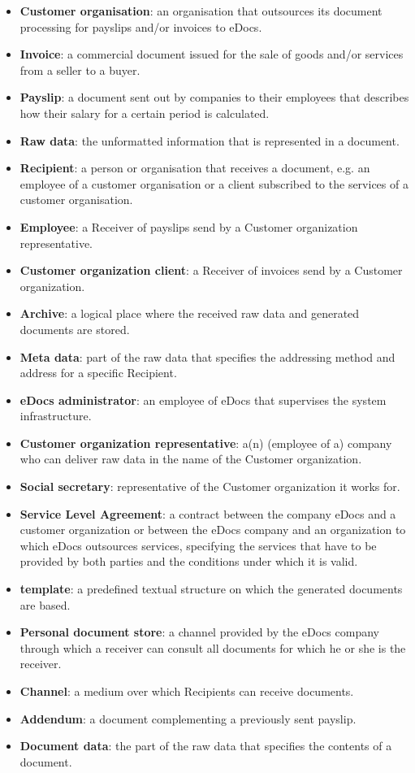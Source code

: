 \documentclass[a4paper,10pt]{article}
\begin{document}
\begin{itemize}
	\item \textbf{Customer organisation}: an organisation that outsources its document processing for payslips and/or
invoices to eDocs.
	\item \textbf{Invoice}: a commercial document issued for the sale of goods and/or services from a seller to a buyer.
	\item \textbf{Payslip}: a document sent out by companies to their employees that describes how their salary for a certain
period is calculated.
\item \textbf{Raw data}: the unformatted information that is represented in a document.
\item \textbf{Recipient}: a person or organisation that receives a document, e.g. an employee of a customer organisation
or a client subscribed to the services of a customer organisation.
	\item \textbf{Employee}: a Receiver of payslips send by a Customer organization representative.
    \item \textbf{Customer organization client}: a Receiver of invoices send by a Customer organization.
    \item \textbf{Archive}: a logical place where the received raw data and generated documents are stored.
    \item \textbf{Meta data}: part of the raw data that specifies the addressing method and address for a specific Recipient.
    \item \textbf{eDocs administrator}: an employee of eDocs that supervises the system infrastructure.
    \item \textbf{Customer organization representative}: a(n) (employee of a) company  who can deliver raw data in the name of the Customer organization.
    \item \textbf{Social secretary}: representative of the Customer organization it works for.
    \item \textbf{Service Level Agreement}: a contract between the company eDocs and a customer organization or between the eDocs company and an organization to which eDocs outsources services, specifying the services that have to be provided by both parties and the conditions under which it is valid. 
    \item \textbf{template}: a predefined textual structure on which the generated documents are based.
    \item \textbf{Personal document store}: a channel provided by the eDocs company through which a receiver can consult all documents for which he or she is the receiver.
    \item \textbf{Channel}: a medium over which Recipients can receive documents.
    \item \textbf{Addendum}: a document complementing a previously sent payslip.
    \item \textbf{Document data}: the part of the raw data that specifies the contents of a document.
\end{itemize}
\end{document}
